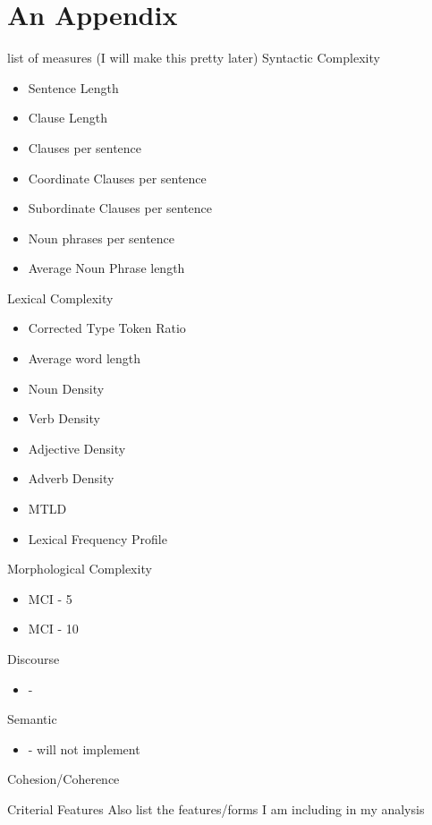 \chapter{An Appendix}

list of measures (I will make this pretty later)
Syntactic Complexity
\begin{itemize}
    \item Sentence Length
    \item Clause Length
    \item Clauses per sentence
    \item Coordinate Clauses per sentence
    \item Subordinate Clauses per sentence
    \item Noun phrases per sentence
    \item Average Noun Phrase length
\end{itemize}

Lexical Complexity
\begin{itemize}
    \item Corrected Type Token Ratio
    \item Average word length
    \item Noun Density
    \item Verb Density
    \item Adjective Density
    \item Adverb Density
    \item MTLD
    \item Lexical Frequency Profile
\end{itemize}

Morphological Complexity
\begin{itemize}
    \item MCI - 5
    \item MCI - 10
\end{itemize}

Discourse
\begin{itemize}
    \item -
\end{itemize}

Semantic
\begin{itemize}
    \item - will not implement
\end{itemize}

Cohesion/Coherence
\begin{itemize}
\end{itemize}


Criterial Features
Also list the features/forms I am including in my analysis